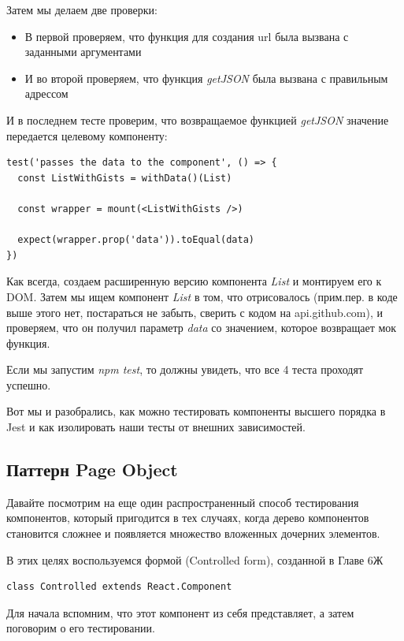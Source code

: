 Затем мы делаем две проверки:

\begin{itemize}
  \item В первой проверяем, что функция для создания url была вызвана с заданными аргументами
  \item И во второй проверяем, что функция \textit{getJSON} была вызвана с правильным адрессом
\end{itemize}

И в последнем тесте проверим, что  возвращаемое функцией \textit{getJSON} значение передается целевому компоненту:

\begin{lstlisting}
test('passes the data to the component', () => {
  const ListWithGists = withData()(List)
  
  const wrapper = mount(<ListWithGists />)
  
  expect(wrapper.prop('data')).toEqual(data)
})
\end{lstlisting}

Как всегда, создаем расширенную версию компонента \textit{List} и монтируем его к DOM. Затем мы ищем компонент \textit{List} в том, что отрисовалось (прим.пер. в коде выше этого нет, постараться не забыть, сверить с кодом на api.github.com), и проверяем, что он получил параметр \textit{data} со значением, которое возвращает мок функция.

Если мы запустим \textit{npm test}, то должны увидеть, что все 4 теста проходят успешно.

Вот мы и разобрались, как можно тестировать компоненты высшего порядка в Jest и как изолировать наши тесты от внешних зависимостей.

\subsection{Паттерн Page Object}

Давайте посмотрим на еще один распространенный способ тестирования компонентов, который пригодится в тех случаях, когда дерево компонентов становится сложнее и появляется множество вложенных дочерних элементов.

В этих целях воспользуемся формой (Controlled form), созданной в Главе 6Ж

\begin{lstlisting}
class Controlled extends React.Component
\end{lstlisting}

Для начала вспомним, что этот компонент из себя представляет, а затем поговорим о его тестировании.

